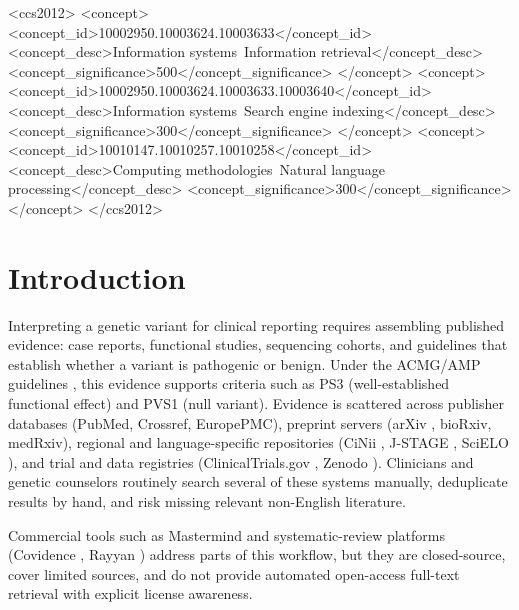 \documentclass[nonacm,sigconf]{acmart}
\begin{document}
\begin{CCSXML}
<ccs2012>
<concept>
<concept_id>10002950.10003624.10003633</concept_id>
<concept_desc>Information systems~Information retrieval</concept_desc>
<concept_significance>500</concept_significance>
</concept>
<concept>
<concept_id>10002950.10003624.10003633.10003640</concept_id>
<concept_desc>Information systems~Search engine indexing</concept_desc>
<concept_significance>300</concept_significance>
</concept>
<concept>
<concept_id>10010147.10010257.10010258</concept_id>
<concept_desc>Computing methodologies~Natural language processing</concept_desc>
<concept_significance>300</concept_significance>
</concept>
</ccs2012>
\end{CCSXML}



\maketitle

\section{Introduction}
\label{sec:intro}

Interpreting a genetic variant for clinical reporting requires assembling
published evidence: case reports, functional studies, sequencing cohorts,
and guidelines that establish whether a variant is pathogenic or benign.
Under the ACMG/AMP guidelines \cite{richards2015standards}, this evidence
supports criteria such as PS3 (well-established functional effect) and PVS1
(null variant). Evidence is scattered across publisher databases (PubMed,
Crossref, EuropePMC), preprint servers (arXiv \cite{ginsparg1994arxiv},
bioRxiv, medRxiv), regional
and language-specific repositories (CiNii \cite{cinii}, J-STAGE
\cite{jstage}, SciELO \cite{scielo}), and trial and
data registries (ClinicalTrials.gov \cite{zarin2016clinicaltrials},
Zenodo \cite{zenodo}). Clinicians and genetic
counselors routinely search several of these systems manually, deduplicate
results by hand, and risk missing relevant non-English literature.

Commercial tools such as Mastermind \cite{mastermind} and systematic-review
platforms (Covidence \cite{covidence}, Rayyan \cite{ouzzani2016rayyan})
address parts of this workflow, but they are closed-source, cover limited
sources, and do not provide automated open-access full-text retrieval with
explicit license awareness.
\end{document}
